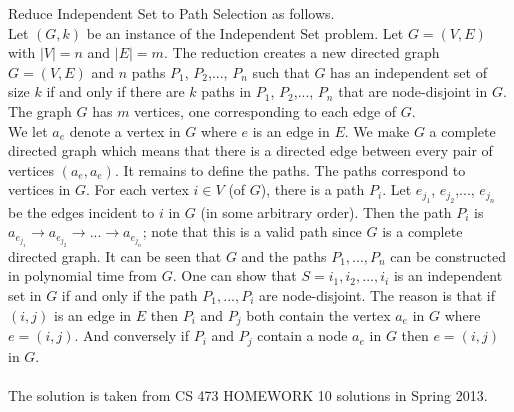\documentclass[11pt]{article}
\begin{document}
\begin{solution}

Reduce Independent Set to Path Selection as follows.\\
Let $(G,k)$ be an instance of the Independent Set problem. Let $G = (V, E)$ with $|V| = n$ and $|E| = m$. The reduction creates a new directed graph $G = (V, E)$ and $n$ paths $P_1$, $P_2$,..., $P_n$ such that $G$ has an independent set of size $k$ if and only if there are $k$ paths in $P_1$, $P_2$,..., $P_n$ that are node-disjoint in $G$. The graph $G$ has $m$ vertices, one corresponding to each edge of $G$.\\
We let $a_e$ denote a vertex in $G$ where $e$ is an edge in $E$. We make $G$ a complete directed graph which means that there is a directed edge between every pair of vertices $(a_e, a_e)$. It remains to define the paths. The paths correspond to vertices in $G$. For each vertex $i \in V$ (of $G$), there is a path $P_i$. Let $e_{j_1}$, $e_{j_2}$,..., $e_{j_n}$ be the edges incident to $i$ in $G$ (in some arbitrary order). Then the path $P_i$ is $a_{e_{j_1}} \to a_{e_{j_2}} \to ... \to a_{e_{j_n}}$; note that this is a valid path since $G$ is a complete directed graph. It can be seen that $G$ and the paths $P_1,..., P_n$ can be constructed in polynomial time from $G$. One can show that $S = {i_1, i_2,..., i_i}$ is an independent set in $G$ if and only if the path $P_1,..., P_i$ are node-disjoint. The reason is that if $(i,j)$ is an edge in $E$ then $P_i$ and $P_j$ both contain the vertex $a_e$ in $G$ where $e = (i, j)$. And conversely if $P_i$ and $P_j$ contain a node $a_e$ in $G$ then $e = (i, j)$ in $G$.\\
\\
The solution is taken from CS 473 HOMEWORK 10 solutions in Spring 2013.
\end{solution}
\end{document}
